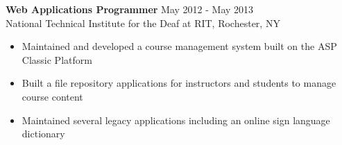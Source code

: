 \documentclass[line,margin]{res}
\begin{document}
\begin{resume}
{\bf Web Applications Programmer} \hfill May 2012 - May 2013\\
    National Technical Institute for the Deaf at RIT,
  Rochester, NY

  \begin{itemize} %
  \item Maintained and developed a course management system built on the ASP Classic Platform
  \item Built a file repository applications for instructors and students to manage course content
  \item Maintained several legacy applications including an online sign language dictionary
  \end{itemize}

\end{resume}
\end{document}
